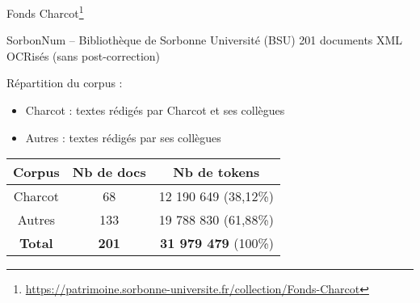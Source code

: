 \begin{frame}{Fonds Charcot\footnote{\tiny{\url{https://patrimoine.sorbonne-universite.fr/collection/Fonds-Charcot}}}}
\begin{block}{SorbonNum
 -- Bibliothèque de Sorbonne Université (BSU)}
201 documents XML OCRisés (sans post-correction)
\end{block}
Répartition du corpus :
\begin{itemize}
    \item \textrm{Charcot} : textes rédigés par Charcot et ses collègues
    \item \textrm{Autres} : textes rédigés par ses collègues
\end{itemize}
\begin{table}[!ht]
\begin{tabular}{|c|c|r|}
\hline
\rowcolor{gray!30}       Corpus & Nb de docs                    & \multicolumn{1}{c|}{Nb de tokens}            \\ \hline
\textrm{Charcot} & 68  & 12 190 649 (38,12\%) \\
\textrm{Autres}  & 133 & 19 788 830 (61,88\%) \\ \hline
\textbf{Total}                  & \textbf{201} & \textbf{31 979 479} (100\%) \\ \hline
\end{tabular}
\end{table}
\end{frame}